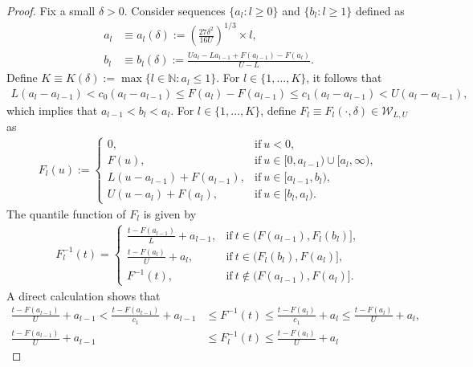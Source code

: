\documentclass[11pt]{article}
\numberwithin{equation}{section}
\begin{document}
\begin{proof}
    Fix a small $\delta > 0$. Consider sequences $\{a_l: l \ge 0\}$ and $\{b_l: l \ge 1\}$ defined as
    \begin{align*}
        a_l &\equiv a_l(\delta):= \left( \frac{27\delta^2}{16U} \right)^{1/3} \times l, \\
        b_l &\equiv b_l(\delta):= \frac{U a_{l} - L a_{l-1} + F(a_{l-1}) - F(a_{l})}{U-L}.
    \end{align*}
    Define $K \equiv K(\delta):= \max \{l \in \mathbb{N} : a_l \leq 1 \}$. For $l \in \{1, \ldots, K\}$, it follows that
    \begin{align*}
        L (a_{l} - a_{l-1}) < c_0 (a_{l} - a_{l-1}) \le F(a_{l}) - F(a_{l-1}) \le c_1 (a_{l} - a_{l-1}) < U (a_{l} - a_{l-1}),
    \end{align*}
    which implies that $a_{l-1} < b_l < a_l$. For $l \in \{1, \ldots, K\}$, define $F_l \equiv F_l(\cdot,\delta)\in\mathcal{W}_{L,U}$ as
    \begin{align*}
        F_l (u) :=
        \begin{cases}
            0, & \text{if}~u < 0, \\
            F(u), & \text{if}~u\in[0,a_{l-1})\cup[a_l, \infty),\\
            L(u-a_{l-1}) + F(a_{l-1}), & \text{if}~u \in [a_{l-1}, b_l), \\
            U(u-a_{l}) + F(a_{l}), & \text{if}~u \in [b_l, a_l). %
        \end{cases}
    \end{align*}
    The quantile function of $F_l$ is given by
    \begin{align*}
        F_l^{-1} (t) =
        \begin{cases}
            \frac{t-F(a_{l-1})}{L} + a_{l-1}, & \text{if}~t \in (F(a_{l-1}), F_l(b_l)], \\
            \frac{t-F(a_{l})}{U} + a_{l}, & \text{if}~t \in (F_l(b_{l}), F(a_l)], \\
            F^{-1}(t), & \text{if}~t \notin (F(a_{l-1}), F(a_l)].
        \end{cases}
    \end{align*}
    A direct calculation shows that
    \begin{align*}
        \frac{t-F(a_{l-1})}{U} + a_{l-1} < \frac{t-F(a_{l-1})}{c_1}+ a_{l-1} &\le F^{-1} (t) \le \frac{t-F(a_{l})}{c_1} + a_{l} \le \frac{t-F(a_{l})}{U} + a_{l}, \\
        \frac{t-F(a_{l-1})}{U} + a_{l-1} &\le F_l^{-1} (t) \le \frac{t-F(a_{l})}{U} + a_{l}

\end{align*}
\end{proof}
\end{document}
